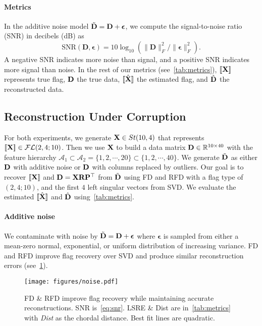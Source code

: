 \paragraph{Metrics}
In the additive noise model $\tilde{\mathbf{D}} = \mathbf{D} +\boldsymbol{\epsilon}$, we compute the signal-to-noise ratio (SNR) in decibels (dB) as 
\begin{equation}\label{eq:snr}
    \mathrm{SNR}(\mathbf{D},\bm{\epsilon}) = 10 \log_{10} \left(\|\mathbf{D}\|_F^2/\|\boldsymbol{\epsilon}\|_F^2\right).
\end{equation}
A negative SNR indicates more noise than signal, and a positive SNR indicates more signal than noise. In the rest of our metrics (see~\cref{tab:metrics}), $[\![\mathbf{X}]\!]$ represents true flag, $\mathbf{D}$ the true data, $[\![\hat{\mathbf{X}}]\!]$ the estimated flag, and $\hat{\mathbf{D}}$ the reconstructed data.



\subsection{Reconstruction Under Corruption}\label{sec: reconstruction}
For both experiments, we generate $\mathbf{X} \in St(10,4)$ that represents $[\![ \mathbf{X} ]\!] \in \mathcal{FL}(2,4;10)$. Then we use $\mathbf{X}$ to build a data matrix $\mathbf{D} \in \mathbb{R}^{10 \times 40}$ with the feature hierarchy $\mathcal{A}_1 \subset \mathcal{A}_2 = \{ 1,2,\cdots,20\} \subset \{1,2,\cdots,40\}$. We generate $\tilde{\mathbf{D}}$ as either $\mathbf{D}$ with additive noise or $\mathbf{D}$ with columns replaced by outliers. Our goal is to recover $[\![ \mathbf{X}]\!]$ and $\mathbf{D}=\mathbf{X}\mathbf{R}\mathbf{P}^\top$ from $\tilde{\mathbf{D}}$ using FD and RFD with a flag type of $(2,4;10)$, and the first $4$ left singular vectors from SVD. We evaluate the estimated $[\![\hat{\mathbf{X}}]\!]$ and $\hat{\mathbf{D}}$ using~\cref{tab:metrics}.

 


\paragraph{Additive noise}
We contaminate with noise by $\tilde{\mathbf{D}} = \mathbf{D}  + \boldsymbol{\epsilon}$ where $\boldsymbol{\epsilon}$ is sampled from either a mean-zero normal, exponential, or uniform distribution of increasing variance. 
FD and RFD improve flag recovery over SVD and produce similar reconstruction errors (see~\cref{fig:synthetic_noise}).

\begin{figure}[t]
    \centering
    \texttt{[image: figures/noise.pdf]}
    \caption{FD \& RFD improve flag recovery while maintaining accurate reconstructions. SNR is~\cref{eq:snr}. LSRE \& Dist are in~\cref{tab:metrics} with \emph{Dist} as the chordal distance. Best fit lines are quadratic.}
    \label{fig:synthetic_noise}
\end{figure}





